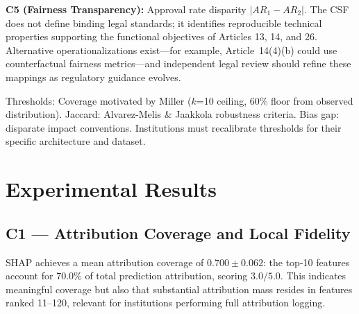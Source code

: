 \documentclass[conference]{IEEEtran}
\begin{document}
\noindent\textbf{C5 (Fairness Transparency):} Approval rate disparity $|AR_1 - AR_2|$. The CSF does not define binding legal standards; it identifies reproducible technical properties supporting the
functional objectives of Articles 13, 14, and 26. Alternative
operationalizations exist—for example, Article~14(4)(b) could
use counterfactual fairness metrics—and independent legal review
should refine these mappings as regulatory guidance evolves.

\begin{table}[h]
\caption{Score Conversion Thresholds}
\label{tab:score_thresh}
\centering
\renewcommand{\arraystretch}{1.2}
\parbox{\columnwidth}{\footnotesize Thresholds: Coverage motivated by Miller \cite{b12} ($k$=10 ceiling, 60\% floor from observed distribution). Jaccard: Alvarez-Melis \& Jaakkola \cite{b14} robustness criteria. Bias gap: disparate impact conventions. Institutions must recalibrate thresholds for their specific architecture and dataset.}
\end{table}

\section{Experimental Results}

\subsection{C1 --- Attribution Coverage and Local Fidelity}

SHAP achieves a mean attribution coverage of $0.700 \pm 0.062$: the top-10 features account for $70.0\%$ of total prediction attribution, scoring $3.0/5.0$. This indicates meaningful coverage but also that substantial attribution mass resides in features ranked 11--120, relevant for institutions performing full attribution logging.
\end{document}
